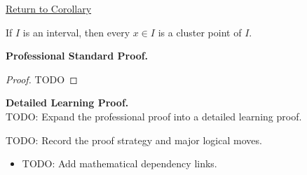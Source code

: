 \newpage
{}
\label{prf:interval-all-limit-points}

\begin{remark*}[Return]
\hyperref[cor:interval-all-limit-points]{Return to Corollary}
\end{remark*}

\begin{corollary*}
If $I$ is an interval, then every $x\in I$ is a cluster point of $I$.
\end{corollary*}

\textbf{Professional Standard Proof.}~\\
\begin{proof}
TODO
\end{proof}

\textbf{Detailed Learning Proof.}~\\
TODO: Expand the professional proof into a detailed learning proof.

\begin{remark*}
TODO: Record the proof strategy and major logical moves.
\end{remark*}

\begin{dependencies}
\begin{itemize}
  \item TODO: Add mathematical dependency links.
\end{itemize}
\end{dependencies}
